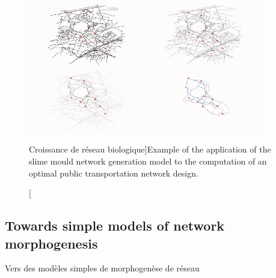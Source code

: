 \begin{figure}
\includegraphics[width=0.45\textwidth]{Figures/NetworkGrowth/tick1}
\includegraphics[width=0.45\textwidth]{Figures/NetworkGrowth/tick20}\\
\includegraphics[width=0.45\textwidth]{Figures/NetworkGrowth/tick50}
\includegraphics[width=0.45\textwidth]{Figures/NetworkGrowth/reseauFinal}
\caption[Biological Network Growth][Croissance de réseau biologique]{Example of the application of the slime mould network generation model to the computation of an optimal public transportation network design.}{}
\label{fig:slimemould}
\end{figure}






\subsection{Towards simple models of network morphogenesis}{Vers des modèles simples de morphogenèse de réseau}

